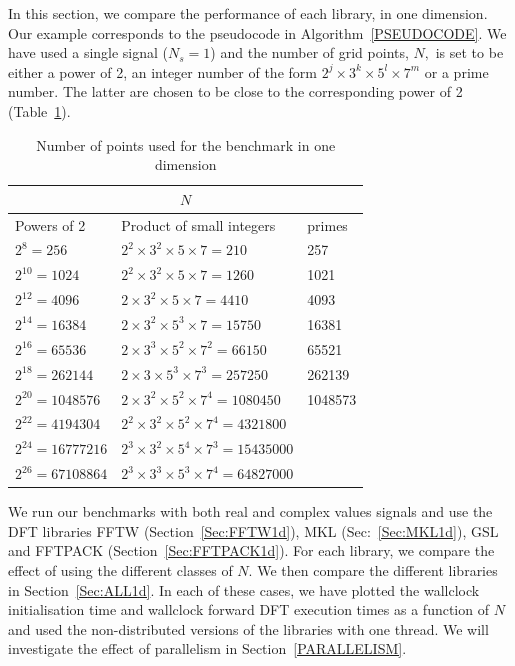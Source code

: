 \documentclass[12pt, a4paper]{article} \setlength{\textheight}{24cm}
\begin{document}
In this section, we compare the performance of each library, in one
dimension.  Our example corresponds to the pseudocode in
Algorithm~\ref{PSEUDOCODE}. We have used a single signal ($N_s=1$) and
the number of grid points, $N,$ is set to be either a power of 2, an
integer number of the form $2^j\times  3^k\times  5^l\times 7^m$ or a prime number. The
latter are chosen to be close to the corresponding power of 2
(Table~\ref{SIZES1D}).
\begin{table}[H]
  \centering
  \begin{tabular}{|l|l|l|}
    \hline
    \multicolumn{3}{|c|}{$N$}\\
    \hline
    \hline
    Powers of 2 & Product of small integers & primes\\ \hline
    $2^8=256$	 & $2^2\times 3^2\times 5\times 7=210$	     & 257  \\ \hline
    $2^{10}=1024$	 & $2^2\times 3^2\times 5\times 7=1260$	     & 1021  \\ \hline
    $2^{12}=4096$	 & $2\times 3^2\times 5\times 7=4410$	     & 4093 \\ \hline
    $2^{14}=16384$	 & $2\times 3^2\times 5^3\times 7=15750$	     & 16381 \\ \hline
    $2^{16}=65536$	 & $2\times 3^3\times 5^2\times 7^2=66150$      & 65521 \\ \hline
    $2^{18}=262144$	 & $2\times 3\times 5^3\times 7^3=257250$       & 262139 \\ \hline
    $2^{20}=1048576$  & $2\times 3^2\times 5^2\times 7^4=1080450$    & 1048573 \\ \hline
    $2^{22}=4194304$  & $2^2\times 3^2\times 5^2 \times 7^4=4321800$  &	\\ \hline
    $2^{24}=16777216$ & $2^3\times 3^2\times 5^4\times 7^3=15435000$ &	\\ \hline
    $2^{26}=67108864$ & $2^3\times 3^3\times 5^3\times 7^4=64827000$ &\\ \hline
  \end{tabular}
  \caption{Number of points used for the benchmark in one dimension}\label{SIZES1D}
\end{table}


We run our benchmarks with both real and complex values signals and
use the DFT libraries FFTW (Section~\ref{Sec:FFTW1d}), MKL
(Sec:~\ref{Sec:MKL1d}), GSL  and FFTPACK
(Section~\ref{Sec:FFTPACK1d}). For each library, we compare the effect
of using the different classes of $N.$ We then compare the different
libraries in Section~\ref{Sec:ALL1d}. In each of these cases, we have
plotted the wallclock initialisation time and wallclock forward DFT
execution times as a function of $N$ and used the non-distributed
versions of the libraries with one thread. We will investigate the
effect of parallelism in Section~\ref{PARALLELISM}.
\end{document}
